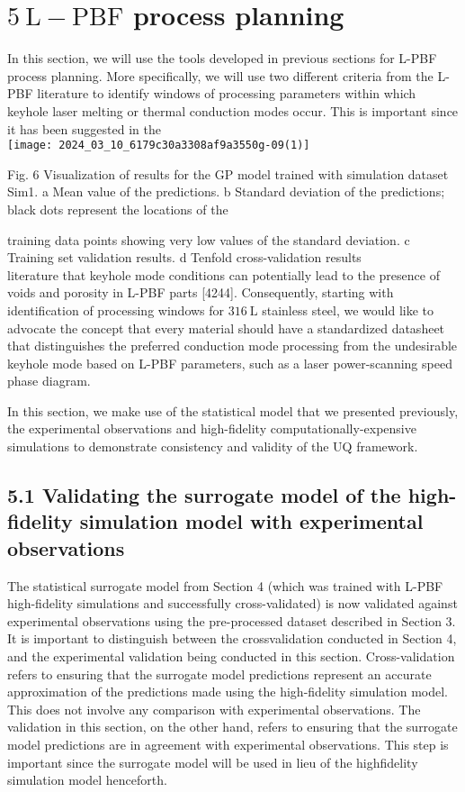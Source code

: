 \documentclass[10pt]{article}
\begin{document}
\section*{$5 \mathrm{~L}-\mathrm{PBF}$ process planning}
In this section, we will use the tools developed in previous sections for L-PBF process planning. More specifically, we will use two different criteria from the L-PBF literature to identify windows of processing parameters within which keyhole laser melting or thermal conduction modes occur. This is important since it has been suggested in the\\
\texttt{[image: 2024\_03\_10\_6179c30a3308af9a3550g-09(1)]}

Fig. 6 Visualization of results for the GP model trained with simulation dataset Sim1. a Mean value of the predictions. b Standard deviation of the predictions; black dots represent the locations of the

training data points showing very low values of the standard deviation. c Training set validation results. d Tenfold cross-validation results\\
literature that keyhole mode conditions can potentially lead to the presence of voids and porosity in L-PBF parts [4244]. Consequently, starting with identification of processing windows for $316 \mathrm{~L}$ stainless steel, we would like to advocate the concept that every material should have a standardized datasheet that distinguishes the preferred conduction mode processing from the undesirable keyhole mode based on L-PBF parameters, such as a laser power-scanning speed phase diagram.

In this section, we make use of the statistical model that we presented previously, the experimental observations and high-fidelity computationally-expensive simulations to demonstrate consistency and validity of the UQ framework.

\subsection*{5.1 Validating the surrogate model of the high-fidelity simulation model with experimental observations}
The statistical surrogate model from Section 4 (which was trained with L-PBF high-fidelity simulations and successfully cross-validated) is now validated against experimental observations using the pre-processed dataset described in Section 3. It is important to distinguish between the crossvalidation conducted in Section 4, and the experimental validation being conducted in this section. Cross-validation refers to ensuring that the surrogate model predictions represent an accurate approximation of the predictions made using the high-fidelity simulation model. This does not involve any comparison with experimental observations. The validation in this section, on the other hand, refers to ensuring that the surrogate model predictions are in agreement with experimental observations. This step is important since the surrogate model will be used in lieu of the highfidelity simulation model henceforth.
\end{document}
